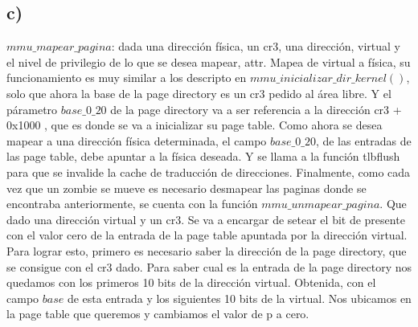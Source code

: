 \subsection*{c)}

$mmu\_mapear\_pagina$: dada una direcci\'on f\'isica, un cr3, una direcci\'on, virtual y el nivel de privilegio de lo 
que se desea mapear, attr. Mapea de virtual a f\'isica, su funcionamiento es muy similar a los descripto en $mmu\_inicializar\_dir\_kernel()$, solo que ahora la base de la page directory es un cr3 pedido al \'area libre. Y el p\'arametro $base\_0\_20$ de la page directory va a ser referencia a la direcci\'on cr3 + 0x1000 , que es donde se va a inicializar 
su page table. Como ahora se desea mapear a una direcci\'on f\'isica determinada, el campo $base\_0\_20$, de las entradas de las page table, debe apuntar a la f\'isica deseada. Y se llama a la funci\'on tlbflush para que
se invalide la cache de traducci\'on de direcciones.\newline
Finalmente, como cada vez que un zombie se mueve es necesario desmapear las paginas donde se encontraba anteriormente, se cuenta con la funci\'on $mmu\_unmapear\_pagina$. Que dado una direcci\'on virtual y un cr3. Se va 
a encargar de setear el bit de presente con el valor cero de la entrada de la page table apuntada por la direcci\'on virtual. Para lograr esto, primero es necesario saber la direcci\'on de la page directory, que se consigue con el cr3 dado. Para saber cual es la entrada de la page directory nos quedamos con los primeros 10 bits de la direcci\'on virtual. Obtenida, con el campo $base$ de esta entrada y los siguientes 10 bits de la virtual. Nos ubicamos en la page table que queremos y cambiamos el valor de p a cero. \newline \newline

